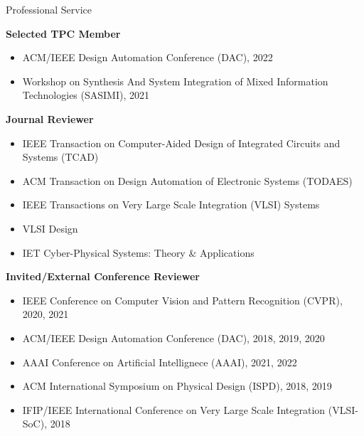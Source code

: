 
\begin{rSection}{Professional Service}

\textbf{Selected TPC Member}
\begin{itemize}
    \item ACM/IEEE Design Automation Conference (DAC), 2022
    \item Workshop on Synthesis And System Integration of Mixed Information Technologies (SASIMI), 2021
\end{itemize}


\textbf{Journal Reviewer}
\begin{itemize}
    \item IEEE Transaction on Computer-Aided Design of Integrated Circuits and Systems (TCAD)
    \item ACM Transaction on Design Automation of Electronic Systems (TODAES)
    \item IEEE Transactions on Very Large Scale Integration (VLSI) Systems
    \item VLSI Design
    \item IET Cyber-Physical Systems: Theory \& Applications
\end{itemize}

\textbf{Invited/External Conference Reviewer}
\begin{itemize}
    \item IEEE Conference on Computer Vision and Pattern Recognition (CVPR), 2020, 2021
    \item ACM/IEEE Design Automation Conference (DAC), 2018, 2019, 2020
    \item AAAI Conference on Artificial Intellignece (AAAI), 2021, 2022
    \item ACM International Symposium on Physical Design (ISPD), 2018, 2019
    \item IFIP/IEEE International Conference on Very Large Scale Integration (VLSI-SoC), 2018
\end{itemize}
\end{rSection}

